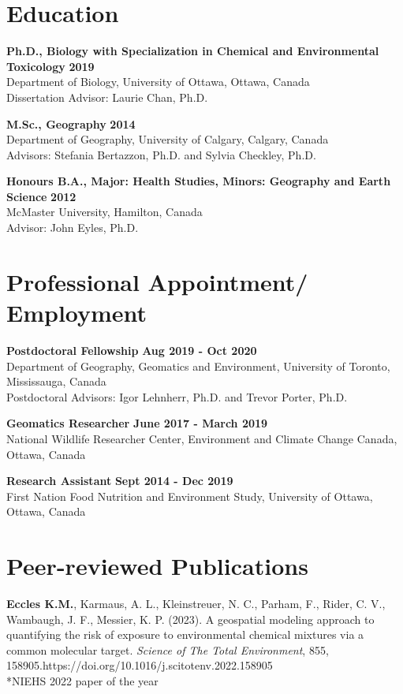 \documentclass[margin,line]{res}
\begin{document}
\begin{resume}
\section{\sc Education}

\textbf{Ph.D., Biology with Specialization in Chemical and Environmental Toxicology} \hfill {\bf 2019}\\
Department of Biology, University of Ottawa, Ottawa, Canada \\
Dissertation Advisor: Laurie Chan, Ph.D.

\textbf{M.Sc., Geography}  \hfill {\bf 2014}\\
Department of Geography, University of Calgary, Calgary, Canada\\
Advisors:  Stefania Bertazzon, Ph.D. and Sylvia Checkley, Ph.D.

\textbf{Honours B.A., Major: Health Studies, Minors: Geography and Earth Science }\hfill {\bf 2012}\\
McMaster University, Hamilton, Canada\\
Advisor: John Eyles, Ph.D.

\vspace*{.1in}
\section{\sc Professional Appointment/ Employment}
{\bf Postdoctoral Fellowship} \hfill {\bf Aug 2019 - Oct 2020}\\
Department of Geography, Geomatics and Environment, University of Toronto, Mississauga, Canada\\
Postdoctoral Advisors: Igor Lehnherr, Ph.D. and Trevor Porter, Ph.D.

{\bf Geomatics Researcher} \hfill {\bf June 2017 - March 2019}\\
National Wildlife Researcher Center, Environment and Climate Change Canada, Ottawa, Canada

{\bf Research Assistant} \hfill {\bf Sept 2014 - Dec 2019}\\
First Nation Food Nutrition and Environment Study, University of Ottawa, Ottawa, Canada

\vspace*{.1in}

\section{\sc Peer-reviewed Publications}

\textbf{Eccles K.M.}, Karmaus, A. L., Kleinstreuer, N. C., Parham, F., Rider, C. V., Wambaugh, J. F., Messier, K. P. (2023). A geospatial modeling approach to quantifying the risk of exposure to environmental chemical mixtures via a common molecular target. \textit{Science of The Total Environment}, 855, 158905.https://doi.org/10.1016/j.scitotenv.2022.158905\\
\mbox{*}NIEHS 2022 paper of the year\\


\end{resume}
\end{document}
